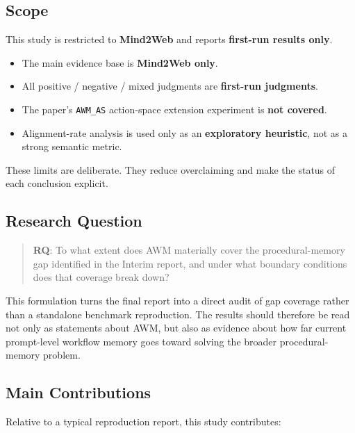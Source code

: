 \documentclass{article}
\providecommand{\tightlist}{%
  \setlength{\itemsep}{0pt}\setlength{\parskip}{0.8em}}
\begin{document}
\subsection{Scope}\label{scope}

This study is restricted to \textbf{Mind2Web} and reports
\textbf{first-run results only}.

\begin{itemize}
\tightlist
\item
  The main evidence base is \textbf{Mind2Web only}.
\item
  All positive / negative / mixed judgments are \textbf{first-run
  judgments}.
\item
  The paper's \texttt{AWM\_AS} action-space extension experiment is
  \textbf{not covered}.
\item
  Alignment-rate analysis is used only as an \textbf{exploratory
  heuristic}, not as a strong semantic metric.
\end{itemize}

These limits are deliberate. They reduce overclaiming and make the
status of each conclusion explicit.

\subsection{Research Question}\label{final-research-question}

\begin{quote}
\textbf{RQ}: To what extent does AWM materially cover the
procedural-memory gap identified in the Interim report, and under what
boundary conditions does that coverage break down?
\end{quote}

This formulation turns the final report into a direct audit of gap
coverage rather than a standalone benchmark reproduction. The results
should therefore be read not only as statements about AWM, but also as
evidence about how far current prompt-level workflow memory goes toward
solving the broader procedural-memory problem.

\subsection{Main Contributions}\label{main-contributions}

Relative to a typical reproduction report, this study contributes:
\end{document}
